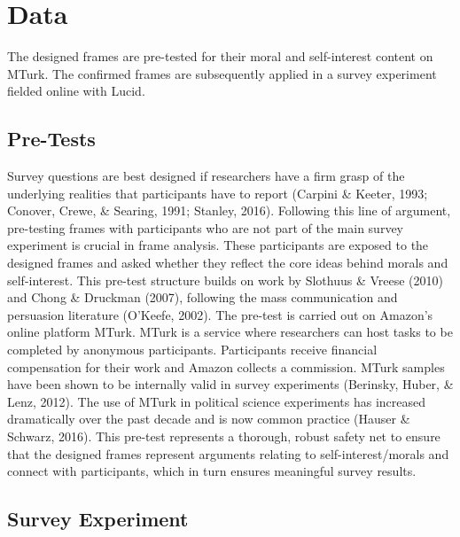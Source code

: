 \documentclass[12pt,econ]{sources/authesis}
\begin{document}
\hypertarget{framing-data}{%
\section{Data}\label{framing-data}}

The designed frames are pre-tested for their moral and self-interest content on MTurk. The confirmed frames are subsequently applied in a survey experiment fielded online with Lucid.

\hypertarget{framing-data-pre_test}{%
\subsection{Pre-Tests}\label{framing-data-pre_test}}

Survey questions are best designed if researchers have a firm grasp of the underlying realities that participants have to report (Carpini \& Keeter, 1993; Conover, Crewe, \& Searing, 1991; Stanley, 2016). Following this line of argument, pre-testing frames with participants who are not part of the main survey experiment is crucial in frame analysis. These participants are exposed to the designed frames and asked whether they reflect the core ideas behind morals and self-interest. This pre-test structure builds on work by Slothuus \& Vreese (2010) and Chong \& Druckman (2007), following the mass communication and persuasion literature (O'Keefe, 2002). The pre-test is carried out on Amazon's online platform MTurk. MTurk is a service where researchers can host tasks to be completed by anonymous participants. Participants receive financial compensation for their work and Amazon collects a commission. MTurk samples have been shown to be internally valid in survey experiments (Berinsky, Huber, \& Lenz, 2012). The use of MTurk in political science experiments has increased dramatically over the past decade and is now common practice (Hauser \& Schwarz, 2016). This pre-test represents a thorough, robust safety net to ensure that the designed frames represent arguments relating to self-interest/morals and connect with participants, which in turn ensures meaningful survey results.

\hypertarget{framing-data-survey}{%
\subsection{Survey Experiment}\label{framing-data-survey}}
\end{document}

